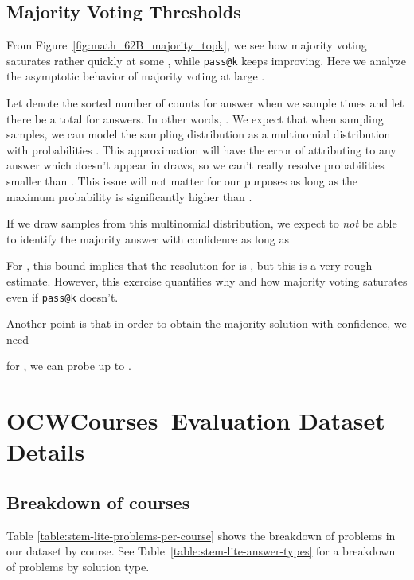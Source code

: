\documentclass{article}
\makeatletter
\newcommand{\ourbenchmark}[0]{{OCWCourses~}}
\newcommand{\passk}[0]{{\texttt{pass@k} }}
\makeatother
\begin{document}
\subsection{Majority Voting Thresholds}
\label{appendix:majority_thresholds}

From Figure~\ref{fig:math_62B_majority_topk}, we see how majority voting saturates rather quickly at some , while \passk keeps improving. Here we analyze the asymptotic behavior of majority voting at large .


Let  denote the sorted number of counts for answer  when we sample  times and let there be a total for  answers. In other words,  . We expect that when sampling  samples, we can model the sampling distribution as a multinomial distribution with probabilities . This approximation will have the error of attributing  to any answer which doesn't appear in  draws, so we can't really resolve probabilities smaller than . This issue will not matter for our purposes as long as the maximum probability  is significantly higher than .

If we draw  samples from this multinomial distribution, we expect to \emph{not} be able to identify the majority answer with  confidence as long as 

For , this bound implies that the resolution for  is , but this is a very rough estimate. However, this exercise quantifies why and how majority voting saturates even if \passk doesn't.

Another point is that in order to obtain the majority solution with  confidence, we need 

for , we can probe up to .


\section{\ourbenchmark Evaluation Dataset Details}
\label{sec:ocw_details}

\subsection{Breakdown of courses}

Table \ref{table:stem-lite-problems-per-course} shows the breakdown of problems in our dataset by course. See Table~\ref{table:stem-lite-answer-types} for a breakdown of problems by solution type.
\end{document}
